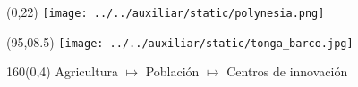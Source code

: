 \documentclass[shownotes,aspectratio=169]{beamer}
\begin{document}
% 
% 
%  
%  
%   


\begin{frame}[plain]
\begin{textblock}{95}(0,22) \centering
\texttt{[image: ../../auxiliar/static/polynesia.png]}
\end{textblock} 

\begin{textblock}{60}(95,08.5) \centering
\texttt{[image: ../../auxiliar/static/tonga\_barco.jpg]}
\end{textblock} 

\begin{textblock}{160}(0,4)
\centering \LARGE \textcolor{black!85}{Agricultura $\mapsto$ Población $\mapsto$ Centros de innovación }
\end{textblock}

\end{frame}
\end{document}

